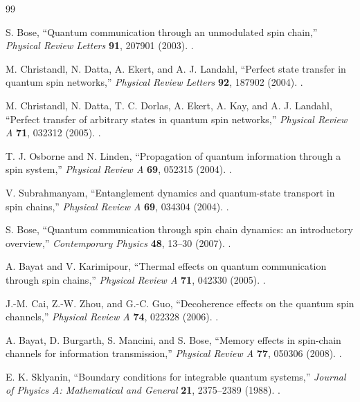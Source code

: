 \documentclass[11pt,a4paper]{article}
\begin{document}
\begin{thebibliography}{99}

S. Bose,
``Quantum communication through an unmodulated spin chain,''
\emph{Physical Review Letters} \textbf{91}, 207901 (2003).
.

M. Christandl, N. Datta, A. Ekert, and A. J. Landahl,
``Perfect state transfer in quantum spin networks,''
\emph{Physical Review Letters} \textbf{92}, 187902 (2004).
.

M. Christandl, N. Datta, T. C. Dorlas, A. Ekert, A. Kay, and A. J. Landahl,
``Perfect transfer of arbitrary states in quantum spin networks,''
\emph{Physical Review A} \textbf{71}, 032312 (2005).
.

T. J. Osborne and N. Linden,
``Propagation of quantum information through a spin system,''
\emph{Physical Review A} \textbf{69}, 052315 (2004).
.

V. Subrahmanyam,
``Entanglement dynamics and quantum-state transport in spin chains,''
\emph{Physical Review A} \textbf{69}, 034304 (2004).
.

S. Bose,
``Quantum communication through spin chain dynamics: an introductory overview,''
\emph{Contemporary Physics} \textbf{48}, 13--30 (2007).
.

A. Bayat and V. Karimipour,
``Thermal effects on quantum communication through spin chains,''
\emph{Physical Review A} \textbf{71}, 042330 (2005).
.

J.-M. Cai, Z.-W. Zhou, and G.-C. Guo,
``Decoherence effects on the quantum spin channels,''
\emph{Physical Review A} \textbf{74}, 022328 (2006).
.

A. Bayat, D. Burgarth, S. Mancini, and S. Bose,
``Memory effects in spin-chain channels for information transmission,''
\emph{Physical Review A} \textbf{77}, 050306 (2008).
.

E. K. Sklyanin,
``Boundary conditions for integrable quantum systems,''
\emph{Journal of Physics A: Mathematical and General} \textbf{21}, 2375--2389 (1988).
.


\end{thebibliography}
\end{document}
